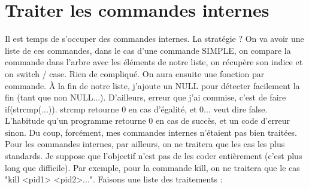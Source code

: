 \chapter[Commandes internes]{Traiter les commandes internes}
Il est temps de s'occuper des commandes internes. La stratégie ? On va avoir une liste de ces commandes, dans le cas d'une commande SIMPLE, on compare la commande dans l'arbre avec les éléments de notre liste, on récupère son indice et on switch / case. Rien de compliqué. On aura ensuite une fonction par commande. À la fin de notre liste, j'ajoute un NULL pour détecter facilement la fin (tant que non NULL...). D'ailleurs, erreur que j'ai commise, c'est de faire if(strcmp(...)). strcmp retourne 0 en cas d'égalité, et 0... veut dire false. L'habitude qu'un programme retourne 0 en cas de succès, et un code d'erreur sinon. Du coup, forcément, mes commandes internes n'étaient pas bien traitées. Pour les commandes internes, par ailleurs, on ne traitera que les cas les plus standards. Je suppose que l'objectif n'est pas de les coder entièrement (c'est plus long que difficile). Par exemple, pour la commande kill, on ne traitera que le cas "kill <pid1> <pid2>...". Faisons une liste des traitements :
